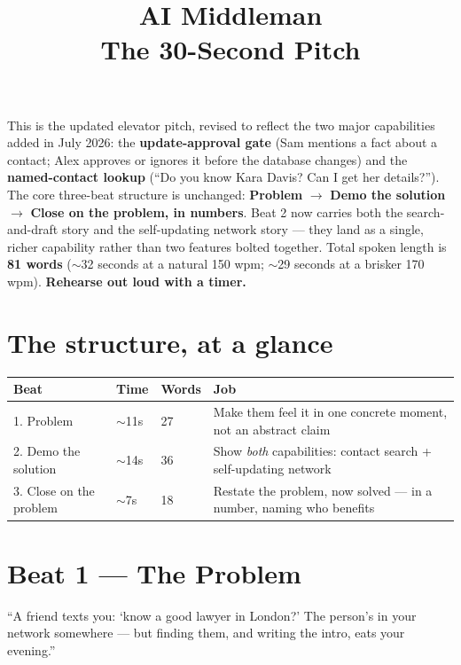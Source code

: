 \documentclass[11pt]{article}
\title{\color{isazipink}\Huge AI Middleman\\\Large The 30-Second Pitch}
\author{}
\date{}
\begin{document}
\maketitle

\begin{tcolorbox}[colback=isazipink!6,colframe=isazipink,title=HOW TO USE THIS DOCUMENT,fonttitle=\bfseries]
This is the updated elevator pitch, revised to reflect the two major capabilities added in July 2026: the \textbf{update-approval gate} (Sam mentions a fact about a contact; Alex approves or ignores it before the database changes) and the \textbf{named-contact lookup} (``Do you know Kara Davis? Can I get her details?''). The core three-beat structure is unchanged: \textbf{Problem} $\to$ \textbf{Demo the solution} $\to$ \textbf{Close on the problem, in numbers}. Beat 2 now carries both the search-and-draft story and the self-updating network story --- they land as a single, richer capability rather than two features bolted together. Total spoken length is \textbf{81 words} ($\sim$32 seconds at a natural 150 wpm; $\sim$29 seconds at a brisker 170 wpm). \textbf{Rehearse out loud with a timer.}
\end{tcolorbox}

\section{The structure, at a glance}

\begin{center}
\begin{tabular}{@{}p{2.2cm}p{2cm}p{1.8cm}p{7.5cm}@{}}
\toprule
Beat & Time & Words & Job \\
\midrule
1. Problem & $\sim$11s & 27 & Make them feel it in one concrete moment, not an abstract claim \\
2. Demo the solution & $\sim$14s & 36 & Show \emph{both} capabilities: contact search + self-updating network \\
3. Close on the problem & $\sim$7s & 18 & Restate the problem, now solved --- in a number, naming who benefits \\
\bottomrule
\end{tabular}
\end{center}

\section{Beat 1 --- The Problem}

\begin{scriptbox}
``A friend texts you: `know a good lawyer in London?' The person's in your network somewhere --- but finding them, and writing the intro, eats your evening.''
\end{scriptbox}
\end{document}
